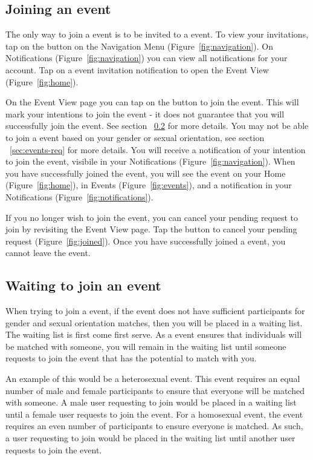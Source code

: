\documentclass[a4paper,11pt,titlepage]{scrartcl}
\newcommand{\textui}[1]{{\fontfamily{pag}\selectfont#1}}
\newcommand{\textaction}[1]{{\fontfamily{cmtt}\selectfont#1}}
\newcommand{\Screenshot}[1]{\textui{#1}}
\newcommand{\action}[1]{\textaction{#1}}
\newcommand{\quicknav}{\Screenshot{Navigation Menu} (Figure~\ref{fig:navigation})}
\begin{document}
\subsection{Joining an event}
\label{sec:events-join}
The only way to join a event is to be invited to a event.  To view your invitations, \action{tap} on the  button on the \quicknav. On \Screenshot{Notifications} (Figure~\ref{fig:navigation}) you can view all notifications for your account.  \action{Tap} on a event invitation notification to open the \Screenshot{Event View} (Figure~\ref{fig:home}).  

On the \Screenshot{Event View} page you can tap on the  button to join the event. This will mark your intentions to join the event - it does not guarantee that you will successfully join the event. See section ~\ref{sec:events-wait} for more details.   You may not be able to join a event based on your gender or sexual orientation, see section ~\ref{sec:events-req} for more details. You will receive a notification of your intention to join the event, visibile in your \Screenshot{Notifications} (Figure~\ref{fig:navigation}).   When you have successfully joined the event, you will see the event on your \Screenshot{Home} (Figure~\ref{fig:home}), in \Screenshot{Events} (Figure~\ref{fig:events}), and a notification in your \Screenshot{Notifications} (Figure~\ref{fig:notifications}).  

If you no longer wish to join the event, you can cancel your pending request to join by revisiting the \Screenshot{Event View} page.  \action{Tap} the  button to cancel your pending request (Figure~\ref{fig:joined}).  Once you have successfully joined a event, you cannot leave the event.

\subsection{Waiting to join an event}
\label{sec:events-wait}
When trying to join a event, if the event does not have sufficient participants for gender and sexual orientation matches, then you will be placed in a waiting list.  The waiting list is first come first serve.  As a event ensures that individuals will be matched with someone, you will remain in the waiting list until someone requests to join the event that has the potential to match with you. 

An example of this would be a heterosexual event.  This event requires an equal number of male and female participants to ensure that everyone will be matched with someone.  A male user requesting to join would be placed in a waiting list until a female user requests to join the event.  For a homosexual event, the event requires an even number of participants to ensure everyone is matched.  As such, a user requesting to join would be placed in the waiting list until another user requests to join the event.
\end{document}
